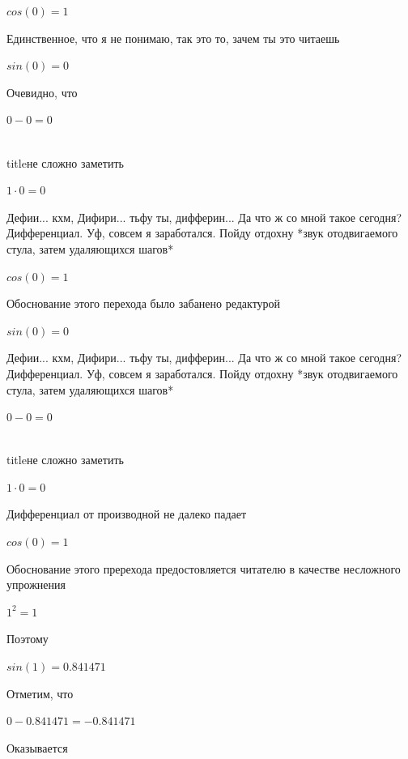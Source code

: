 \documentclass[12pt,a4paper,fleqn]{article}
\begin{document}
\begin{center}$cos(0) = 1$\end{center}
Единственное, что я не понимаю, так это то, зачем ты это читаешь

\begin{center}$sin(0) = 0$\end{center}
Очевидно, что

\begin{center}$0-0 = 0$\end{center}
\\ title{не сложно заметить} 

\begin{center}$1 \cdot 0 = 0$\end{center}
Дефии... кхм, Дифири... тьфу ты, дифферин... Да что ж со мной такое сегодня? Дифференциал. Уф, совсем я заработался. Пойду отдохну *звук отодвигаемого стула, затем удаляющихся шагов*

\begin{center}$cos(0) = 1$\end{center}
Обоснование этого перехода было забанено редактурой

\begin{center}$sin(0) = 0$\end{center}
Дефии... кхм, Дифири... тьфу ты, дифферин... Да что ж со мной такое сегодня? Дифференциал. Уф, совсем я заработался. Пойду отдохну *звук отодвигаемого стула, затем удаляющихся шагов*

\begin{center}$0-0 = 0$\end{center}
\\ title{не сложно заметить} 

\begin{center}$1 \cdot 0 = 0$\end{center}
Дифференциал от производной не далеко падает\cite{link2}

\begin{center}$cos(0) = 1$\end{center}
Обоснование этого пререхода предостовляется читателю в качестве несложного упрожнения

\begin{center}$1^{2} = 1$\end{center}
Поэтому

\begin{center}$sin(1) = 0.841471$\end{center}
Отметим, что

\begin{center}$0-0.841471 = -0.841471$\end{center}
Оказывается
\end{document}
